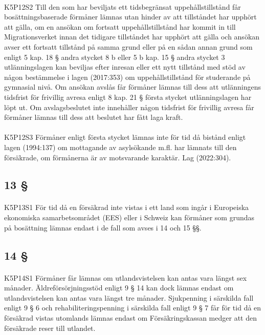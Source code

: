 \documentclass[a4paper,notitlepage,openany,10pt]{book}
\begin{document}
\paragraph*{}
{\tiny K5P12S2}
Till den som har beviljats ett tidsbegränsat uppehållstillstånd får bosättningsbaserade förmåner lämnas utan hinder av att tillståndet har upphört att gälla, om en ansökan om fortsatt uppehållstillstånd har kommit in till Migrationsverket innan det tidigare tillståndet har upphört att gälla och ansökan avser ett fortsatt tillstånd på samma grund eller på en sådan annan grund som enligt 5 kap. 18 § andra stycket 8 b eller 5 b kap. 15 § andra stycket 3 utlänningslagen kan beviljas efter inresan eller ett nytt tillstånd med stöd av någon bestämmelse i lagen (2017:353) om uppehållstillstånd för studerande på gymnasial nivå. Om ansökan avslås får förmåner lämnas till dess att utlänningens tidsfrist för frivillig avresa enligt 8 kap. 21 § första stycket utlänningslagen har löpt ut. Om avslagsbeslutet inte innehåller någon tidsfrist för frivillig avresa får förmåner lämnas till dess att beslutet har fått laga kraft.
\paragraph*{}
{\tiny K5P12S3}
Förmåner enligt första stycket lämnas inte för tid då bistånd enligt lagen (1994:137) om mottagande av asylsökande m.fl. har lämnats till den försäkrade, om förmånerna är av motsvarande karaktär.
Lag (2022:304).
\subsection*{13 §}
\paragraph*{}
{\tiny K5P13S1}
För tid då en försäkrad inte vistas i ett land som ingår i Europeiska ekonomiska samarbetsområdet (EES) eller i Schweiz kan förmåner som grundas på bosättning lämnas endast i de fall som avses i 14 och 15 §§.
\subsection*{14 §}
\paragraph*{}
{\tiny K5P14S1}
Förmåner får lämnas om utlandsvistelsen kan antas vara längst sex månader. Äldreförsörjningsstöd enligt 9 § 14 kan dock lämnas endast om utlandsvistelsen kan antas vara längst tre månader. Sjukpenning i särskilda fall enligt 9 § 6 och rehabiliteringspenning i särskilda fall enligt 9 § 7 får för tid då en försäkrad vistas utomlands lämnas endast om Försäkringskassan medger att den försäkrade reser till utlandet.
\end{document}
